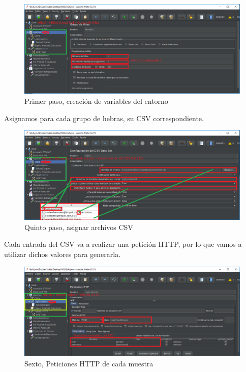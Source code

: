 \documentclass[12pt,a4paper]{article}
\begin{document}
	\begin{figure}[h]
		\centering
		\includegraphics[width=1.0\textwidth]{images/step-4.png}
		\caption{Primer paso, creación de variables del entorno}
	\end{figure}
	
	\newpage
	Asignamos para cada grupo de hebras, su CSV correspondiente.
	\begin{figure}[h]
		\centering
		\includegraphics[width=1.0\textwidth]{images/step-5.png}
		\caption{Quinto paso, asignar archivos CSV}
	\end{figure}

	Cada entrada del CSV va a realizar una petición HTTP, por lo que vamos a utilizar dichos valores para generarla.

	\begin{figure}[h]
		\centering
		\includegraphics[width=1.0\textwidth]{images/step-6.png}
		\caption{Sexto, Peticiones HTTP de cada muestra}
	\end{figure}
\end{document}

